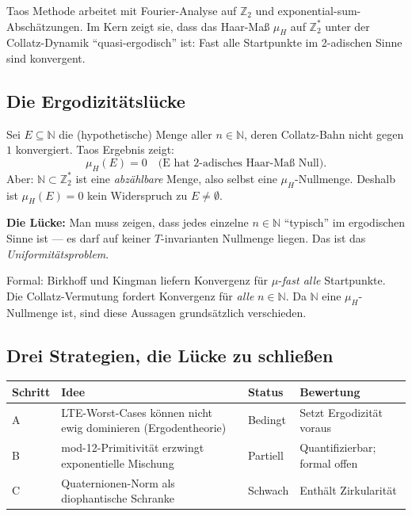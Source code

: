 \documentclass[12pt,a4paper]{article}
\newcommand{\N}{\mathbb{N}}
\newcommand{\Ztwo}{\mathbb{Z}_2}
\begin{document}
Taos Methode arbeitet mit Fourier-Analyse auf $\Ztwo$ und
exponential-sum-Abschätzungen. Im Kern zeigt sie, dass das
Haar-Maß $\mu_H$ auf $\Ztwo^*$ unter der Collatz-Dynamik
``quasi-ergodisch'' ist: Fast alle Startpunkte im 2-adischen Sinne
sind konvergent.

\subsection{Die Ergodizitätslücke}

\begin{tcolorbox}[lücke, title={Das Maß-$0$-Problem (zentral)}]
Sei $E \subseteq \N$ die (hypothetische) Menge aller $n \in \N$,
deren Collatz-Bahn nicht gegen $1$ konvergiert. Taos Ergebnis zeigt:
\[
  \mu_H(E) = 0
  \quad\text{(E hat 2-adisches Haar-Maß Null).}
\]
Aber: $\N \subset \Ztwo^*$ ist eine \emph{abzählbare} Menge, also
selbst eine $\mu_H$-Nullmenge. Deshalb ist $\mu_H(E) = 0$ kein
Widerspruch zu $E \neq \emptyset$.

\medskip
\textbf{Die Lücke:} Man muss zeigen, dass jedes einzelne $n \in \N$
``typisch'' im ergodischen Sinne ist --- es darf auf keiner
$T$-invarianten Nullmenge liegen. Das ist das
\emph{Uniformitätsproblem}.
\end{tcolorbox}

Formal: Birkhoff und Kingman liefern Konvergenz für
$\mu$-\emph{fast alle} Startpunkte. Die Collatz-Vermutung fordert
Konvergenz für \emph{alle} $n \in \N$. Da $\N$ eine $\mu_H$-Nullmenge
ist, sind diese Aussagen grundsätzlich verschieden.

\subsection{Drei Strategien, die Lücke zu schließen}

\begin{center}
\renewcommand{\arraystretch}{1.4}
\begin{tabular}{>{\raggedright}p{1.8cm}
                >{\raggedright}p{5.5cm}
                >{\centering}p{2.0cm}
                >{\raggedright\arraybackslash}p{3.8cm}}
\toprule
\textbf{Schritt} & \textbf{Idee} & \textbf{Status} & \textbf{Bewertung} \\
\midrule
A & LTE-Worst-Cases können nicht ewig dominieren (Ergodentheorie)
  & \textcolor{warnorange}{Bedingt}
  & Setzt Ergodizität voraus \\[2pt]
B & mod-12-Primitivität erzwingt exponentielle Mischung
  & \textcolor{bewiesengrün}{Partiell}
  & Quantifizierbar; formal offen \\[2pt]
C & Quaternionen-Norm als diophantische Schranke
  & \textcolor{lückenrot}{Schwach}
  & Enthält Zirkularität \\
\bottomrule
\end{tabular}
\end{center}
\end{document}
